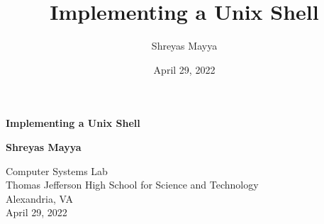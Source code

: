 \documentclass[12pt,twoside]{report} %
\title{Implementing a Unix Shell}
\author{Shreyas Mayya}
\date{April 29, 2022}
\begin{document}

%


\sloppy


	\begin{titlepage}
		\begin{center}
			\vspace*{1.75in}
			\Huge
			\textbf{Implementing a Unix Shell}
			\vspace{0.5in}

			\LARGE
			\textbf{Shreyas Mayya}
			\vspace{0.5in}

			\Large
			Computer Systems Lab\\
			Thomas Jefferson High School for Science and Technology\\
			Alexandria, VA\\
			April 29, 2022
		\end{center}
	\end{titlepage}


	\newcommand\blankpage{%
		\null
		\thispagestyle{empty}%
		\addtocounter{page}{-1}%
		\newpage}

	\afterpage{\blankpage{}}

	

	\tableofcontents

	
\end{document}

